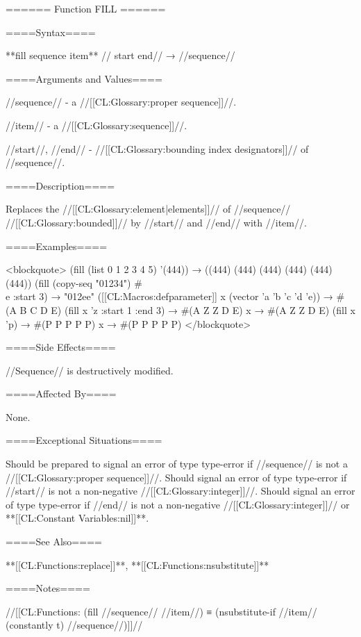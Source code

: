 ====== Function FILL ======

====Syntax====

**fill {sequence item** //\key} start end// → //sequence//

====Arguments and Values====

//sequence// - a //[[CL:Glossary:proper sequence]]//.

//item// - a //[[CL:Glossary:sequence]]//.

//start//, //end// - //[[CL:Glossary:bounding index designators]]// of //sequence//. 


====Description====

Replaces the //[[CL:Glossary:element|elements]]// of //sequence// //[[CL:Glossary:bounded]]// by //start// and //end// with //item//.

====Examples====

<blockquote> (fill (list 0 1 2 3 4 5) '(444)) → ((444) (444) (444) (444) (444) (444)) (fill (copy-seq "01234") #\\e :start 3) → "012ee" ([[CL:Macros:defparameter]] x (vector 'a 'b 'c 'd 'e)) → #(A B C D E) (fill x 'z :start 1 :end 3) → #(A Z Z D E) x → #(A Z Z D E) (fill x 'p) → #(P P P P P) x → #(P P P P P) </blockquote>

====Side Effects====

//Sequence// is destructively modified.

====Affected By====

None.

====Exceptional Situations====

Should be prepared to signal an error of type type-error if //sequence// is not a //[[CL:Glossary:proper sequence]]//. Should signal an error of type type-error if //start// is not a non-negative //[[CL:Glossary:integer]]//. Should signal an error of type type-error if //end// is not a non-negative //[[CL:Glossary:integer]]// or **[[CL:Constant Variables:nil]]**.

====See Also====

**[[CL:Functions:replace]]**, **[[CL:Functions:nsubstitute]]**

====Notes====

//[[CL:Functions: (fill //sequence// //item//) ≡ (nsubstitute-if //item// (constantly t) //sequence//)]]//

 
